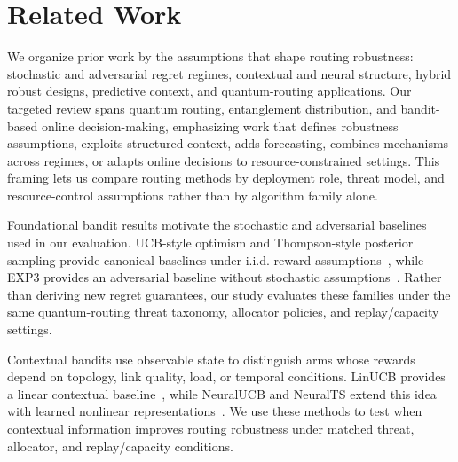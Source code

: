 \section{Related Work}
\label{sec:RelatedWork}

We organize prior work by the assumptions that shape routing robustness: stochastic and adversarial regret regimes, contextual and neural structure, hybrid robust designs, predictive context, and quantum-routing applications. Our targeted review spans quantum routing, entanglement distribution, and bandit-based online decision-making, emphasizing work that defines robustness assumptions, exploits structured context, adds forecasting, combines mechanisms across regimes, or adapts online decisions to resource-constrained settings. This framing lets us compare routing methods by deployment role, threat model, and resource-control assumptions rather than by algorithm family alone.


Foundational bandit results motivate the stochastic and adversarial baselines used in our evaluation. UCB-style optimism and Thompson-style posterior sampling provide canonical baselines under i.i.d. reward assumptions~\cite{auer2002finite,thompson1933likelihood}, while EXP3 provides an adversarial baseline without stochastic assumptions~\cite{auer2002nonstochastic}. Rather than deriving new regret guarantees, our study evaluates these families under the same quantum-routing threat taxonomy, allocator policies, and replay/capacity settings.


Contextual bandits use observable state to distinguish arms whose rewards depend on topology, link quality, load, or temporal conditions. LinUCB provides a linear contextual baseline~\cite{li2010contextual}, while NeuralUCB and NeuralTS extend this idea with learned nonlinear representations~\cite{zhou2020neuralucb,zhang2022neuralts}. We use these methods to test when contextual information improves routing robustness under matched threat, allocator, and replay/capacity conditions.


